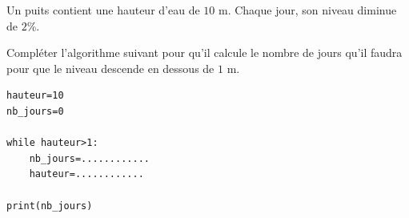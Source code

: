 \begin{exo}{}
	Un puits contient une hauteur d'eau de $10$ m. Chaque jour, son niveau diminue de $2$\%.

	Compléter l'algorithme suivant pour qu'il calcule le nombre de jours qu'il faudra pour que le niveau descende en dessous de $1$ m.

	\begin{lstlisting}
hauteur=10
nb_jours=0

while hauteur>1:
    nb_jours=............
    hauteur=............

print(nb_jours)
\end{lstlisting}
\end{exo}
